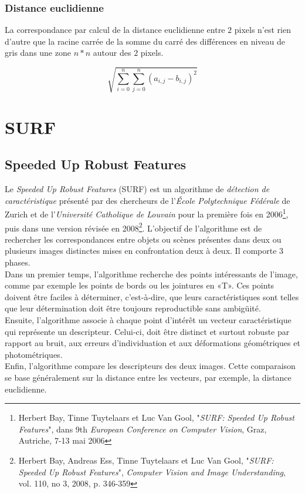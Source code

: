 \documentclass[a4paper,11pt]{report}
\begin{document}
\subsubsection{Distance euclidienne}
La correspondance par calcul de la distance euclidienne entre $2$ pixels n'est rien d'autre que la racine carrée de la somme du carré des différences en niveau de gris dans une zone $n*n$ autour des $2$ pixels.

$$ \sqrt{\sum_{i=0}^{n}\sum_{j=0}^{n}(a_{i,j} - b_{i,j})^2} $$


\pagebreak
\section{SURF}

\subsection{Speeded Up Robust Features}
Le \textit{Speeded Up Robust Features} (SURF) est un algorithme de \textit{détection de caractéristique} présenté par des chercheurs de l'\textit{\'Ecole Polytechnique Fédérale} de Zurich et de l'\textit{Université Catholique de Louvain} pour la première fois en 2006\footnote{Herbert Bay, Tinne Tuytelaars et Luc Van Gool, "\textit{SURF: Speeded Up Robust Features}", dans 9th \textit{European Conference on Computer Vision}, Graz, Autriche, 7-13 mai 2006}, puis dans une version révisée en 2008\footnote{Herbert Bay, Andreas Ess, Tinne Tuytelaars et Luc Van Gool, "\textit{SURF: Speeded Up Robust Features}", \textit{Computer Vision and Image Understanding}, vol. 110, no 3, 2008, p. 346-359}.
L'objectif de l'algorithme est de rechercher les correspondances entre objets ou scènes présentes dans deux ou plusieurs images distinctes mises en confrontation deux à deux. Il comporte 3 phases. 
\\Dans un premier temps, l'algorithme recherche des points intéressants de l'image, comme par exemple les points de bords ou les jointures en «T». Ces points doivent être faciles à déterminer, c'est-à-dire, que leurs caractéristiques sont telles que leur détermination doit être toujours reproductible sans ambigüité. \\ 
Ensuite, l'algorithme associe à chaque point d'intérêt un vecteur caractéristique qui représente un descripteur. Celui-ci, doit être distinct et surtout robuste par rapport au bruit, aux erreurs d'individuation et aux déformations géométriques et photométriques. \\
Enfin,  l'algorithme compare les descripteurs des deux images. Cette comparaison se base généralement sur la distance entre les vecteurs, par exemple, la distance euclidienne.
\end{document}
